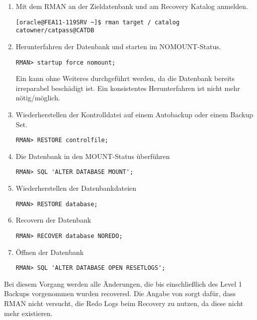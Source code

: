         \begin{enumerate}
          \item Mit dem RMAN an der Zieldatenbank und am Recovery Katalog anmelden.
            \begin{lstlisting}[caption={An der Zieldatenbank und am Recovery Katalog anmelden},label=admin1531,language=rman]
[oracle@FEA11-119SRV ~]$ rman target / catalog catowner/catpass@CATDB
            \end{lstlisting}
          \item Herunterfahren der Datenbank und starten im NOMOUNT-Status.
            \begin{lstlisting}[caption={Shutdown und Mounten},label=admin1532,language=rman,alsolanguage=sqlplus]
RMAN> startup force nomount;
            \end{lstlisting}
            Ein  kann ohne Weiteres durchgef\"uhrt werden, da die Datenbank bereits irreparabel besch\"adigt ist. Ein konsistentes Herunterfahren ist nicht mehr n\"otig/m\"oglich.
          \item Wiederherstellen der Kontrolldatei auf einem Autobackup oder einem Backup Set.
            \begin{lstlisting}[caption={Kontrolldatei wiederherstellen},label=admin1533,language=rman]
RMAN> RESTORE controlfile;
            \end{lstlisting}
          \item Die Datenbank in den MOUNT-Status \"uberf\"uhren
            \begin{lstlisting}[caption={MOUNT-Status erreichen},label=admin1534,language=rman,emph={[9]ALTER, DATABASE,MOUNT},emphstyle={[9]\color{magenta}\bfseries}]
RMAN> SQL 'ALTER DATABASE MOUNT';
            \end{lstlisting}
          \item Wiederherstellen der Datenbankdateien
            \begin{lstlisting}[caption={Datenbankdateien wiederherstellen},label=admin1535,language=rman]
RMAN> RESTORE database;
            \end{lstlisting}
          \item Recovern der Datenbank
            \begin{lstlisting}[caption={Datenbankdateien wiederherstellen},label=admin1536,language=rman]
RMAN> RECOVER database NOREDO;
            \end{lstlisting}
          \item \"Offnen der Datenbank
            \begin{lstlisting}[caption={Datenbank mit open resetlogs \"offnen},label=admin1537,language=rman,emph={[9]ALTER,DATABASE,OPEN,RESETLOGS},emphstyle={[9]\color{magenta}\bfseries}]
RMAN> SQL 'ALTER DATABASE OPEN RESETLOGS';
            \end{lstlisting}
        \end{enumerate}
        Bei diesem Vorgang werden alle \"Anderungen, die bis einschlie\ss{}lich des Level 1 Backups vorgenommen wurden recovered. Die Angabe von  sorgt daf\"ur, dass RMAN nicht versucht, die Redo Logs beim Recovery zu nutzen, da diese nicht mehr existieren.

